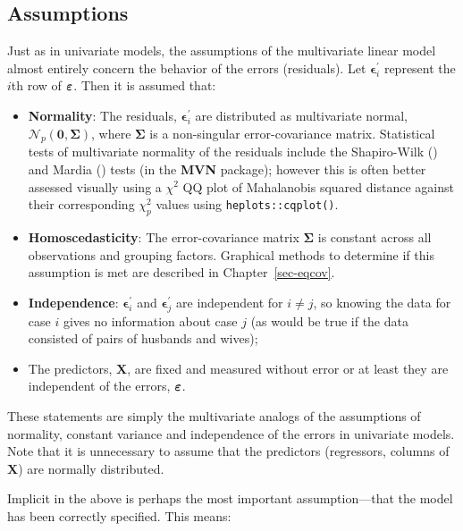 \documentclass[
  letterpaper,
  10pt,
  krantz2]{krantz}
\providecommand{\tightlist}{%
  \setlength{\itemsep}{0pt}\setlength{\parskip}{0pt}}\usepackage{longtable,booktabs,array}
\begin{document}
\subsection{Assumptions}\label{assumptions}

Just as in univariate models, the assumptions of the multivariate linear
model almost entirely concern the behavior of the errors (residuals).
Let \(\mathbf{\epsilon}_{i}^{\prime}\) represent the \(i\)th row of
\(\boldsymbol{\Large\varepsilon}\). Then it is assumed that:

\begin{itemize}
\tightlist
\item
  \textbf{Normality}: The residuals, \(\mathbf{\epsilon}_{i}^{\prime}\)
  are distributed as multivariate normal,
  \(\mathcal{N}_{p}(\mathbf{0},\boldsymbol{\Sigma})\), where
  \(\mathbf{\Sigma}\) is a non-singular error-covariance matrix.
  Statistical tests of multivariate normality of the residuals include
  the Shapiro-Wilk () and Mardia () tests
  (in the \textbf{MVN} package); however this is often better assessed
  visually using a \(\chi^2\) QQ plot of Mahalanobis squared distance
  against their corresponding \(\chi^2_p\) values using
  \texttt{heplots::cqplot()}.
\item
  \textbf{Homoscedasticity}: The error-covariance matrix
  \(\mathbf{\Sigma}\) is constant across all observations and grouping
  factors. Graphical methods to determine if this assumption is met are
  described in Chapter~\ref{sec-eqcov}.
\item
  \textbf{Independence}: \(\mathbf{\epsilon}_{i}^{\prime}\) and
  \(\mathbf{\epsilon}_{j}^{\prime}\) are independent for \(i\neq j\), so
  knowing the data for case \(i\) gives no information about case \(j\)
  (as would be true if the data consisted of pairs of husbands and
  wives);
\item
  The predictors, \(\mathbf{X}\), are fixed and measured without error
  or at least they are independent of the errors,
  \(\boldsymbol{\Large\varepsilon}\).
\end{itemize}

These statements are simply the multivariate analogs of the assumptions
of normality, constant variance and independence of the errors in
univariate models. Note that it is unnecessary to assume that the
predictors (regressors, columns of \(\mathbf{X}\)) are normally
distributed.

Implicit in the above is perhaps the most important assumption---that
the model has been correctly specified. This means:
\end{document}
